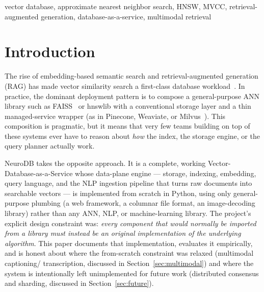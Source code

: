 \documentclass[conference]{IEEEtran}
\begin{document}
\begin{IEEEkeywords}
vector database, approximate nearest neighbor search, HNSW, MVCC, retrieval-augmented generation, database-as-a-service, multimodal retrieval
\end{IEEEkeywords}

\section{Introduction}

The rise of embedding-based semantic search and retrieval-augmented generation (RAG) has
made vector similarity search a first-class database workload~\cite{lewis2020rag}. In
practice, the dominant deployment pattern is to compose a general-purpose ANN library such
as FAISS~\cite{johnson2019faiss} or hnswlib with a conventional storage layer and a thin
managed-service wrapper (as in Pinecone, Weaviate, or Milvus~\cite{wang2021milvus}). This
composition is pragmatic, but it means that very few teams building on top of these systems
ever have to reason about \emph{how} the index, the storage engine, or the query planner
actually work.

NeuroDB takes the opposite approach. It is a complete, working Vector-Database-as-a-Service
whose data-plane engine --- storage, indexing, embedding, query language, and the NLP
ingestion pipeline that turns raw documents into searchable vectors --- is implemented from
scratch in Python, using only general-purpose plumbing (a web framework, a columnar
file format, an image-decoding library) rather than any ANN, NLP, or machine-learning
library. The project's explicit design constraint was: \emph{every component that would
normally be imported from a library must instead be an original implementation of the
underlying algorithm}. This paper documents that implementation, evaluates it empirically,
and is honest about where the from-scratch constraint was relaxed (multimodal captioning/
transcription, discussed in Section~\ref{sec:multimodal}) and where the system is
intentionally left unimplemented for future work (distributed consensus and sharding,
discussed in Section~\ref{sec:future}).
\end{document}
